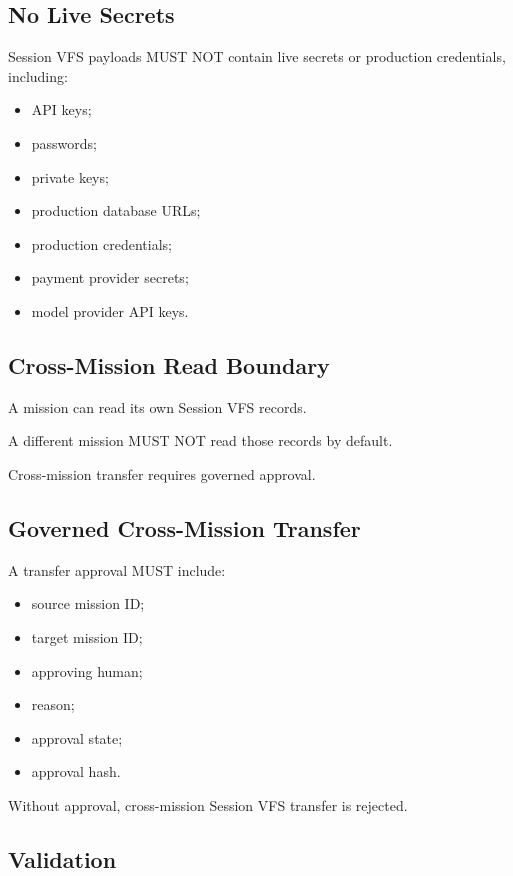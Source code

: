 \subsection{No Live Secrets}

Session VFS payloads MUST NOT contain live secrets or production credentials, including:

\begin{itemize}
  \item API keys;
  \item passwords;
  \item private keys;
  \item production database URLs;
  \item production credentials;
  \item payment provider secrets;
  \item model provider API keys.
\end{itemize}

\subsection{Cross-Mission Read Boundary}

A mission can read its own Session VFS records.

A different mission MUST NOT read those records by default.

Cross-mission transfer requires governed approval.

\subsection{Governed Cross-Mission Transfer}

A transfer approval MUST include:

\begin{itemize}
  \item source mission ID;
  \item target mission ID;
  \item approving human;
  \item reason;
  \item approval state;
  \item approval hash.
\end{itemize}

Without approval, cross-mission Session VFS transfer is rejected.

\subsection{Validation}

